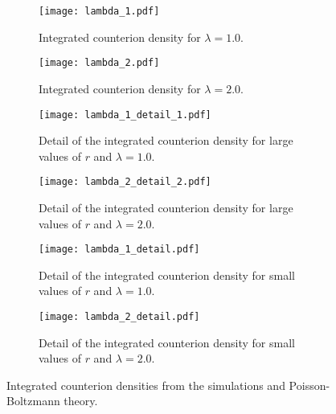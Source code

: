 \documentclass[a4paper,10pt,bibtotoc]{scrartcl}
\begin{document}
\begin{figure}[ht]
\begin{subfigure}{.5\textwidth}
  \centering
  \texttt{[image: lambda\_1.pdf]}  
  \caption{Integrated counterion density for $\lambda=1.0$.}
  \label{fig:counter1}
\end{subfigure}
\begin{subfigure}{.5\textwidth}
  \centering
  \texttt{[image: lambda\_2.pdf]}  
  \caption{Integrated counterion density for $\lambda=2.0$.}
  \label{fig:counter2}
\end{subfigure}
\begin{subfigure}{.5\textwidth}
  \centering
  \texttt{[image: lambda\_1\_detail\_1.pdf]}  
  \caption{Detail of the integrated counterion density for large values of $r$ and $\lambda=1.0$.}
  \label{fig:counter3}
\end{subfigure}
\begin{subfigure}{.5\textwidth}
  \centering
  \texttt{[image: lambda\_2\_detail\_2.pdf]}  
  \caption{Detail of the integrated counterion density for large values of $r$ and $\lambda=2.0$.}
  \label{fig:counter4}
\end{subfigure}
\begin{subfigure}{.5\textwidth}
  \centering
  \texttt{[image: lambda\_1\_detail.pdf]}  
  \caption{Detail of the integrated counterion density for small values of $r$ and $\lambda=1.0$.}
  \label{fig:counter5}
\end{subfigure}
\begin{subfigure}{.5\textwidth}
  \centering
  \texttt{[image: lambda\_2\_detail.pdf]}  
  \caption{Detail of the integrated counterion density for small values of $r$ and $\lambda=2.0$.}
  \label{fig:counter6}
\end{subfigure}
\caption{Integrated counterion densities from the simulations and Poisson-Boltzmann theory.}
\label{fig:fig}
\end{figure}
\end{document}
